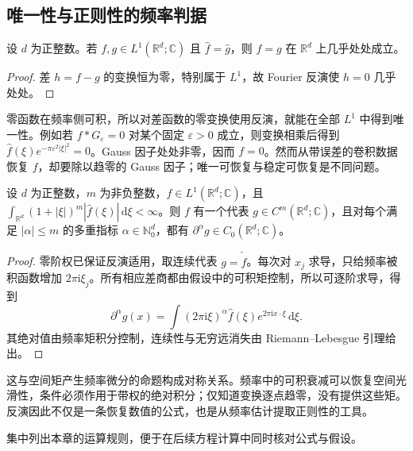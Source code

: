 \subsection{唯一性与正则性的频率判据}
\label{b2:subsec:030504}

\begin{corollary}[唯一性]\label{b2:cor:03-uniqueness}
设 \(d\) 为正整数。若 \(f,g\in L^1(\mathbb R^d;\mathbb C)\) 且 \(\widehat f=\widehat g\)，则 \(f=g\) 在 \(\mathbb R^d\) 上几乎处处成立。
\end{corollary}
\begin{proof}
差 \(h=f-g\) 的变换恒为零，特别属于 \(L^1\)，故 Fourier 反演使 \(h=0\) 几乎处处。
\end{proof}

零函数在频率侧可积，所以对差函数的零变换使用反演，就能在全部 \(L^1\) 中得到唯一性。例如若 \(f*G_\varepsilon=0\) 对某个固定 \(\varepsilon>0\) 成立，则变换相乘后得到 \(\widehat f(\xi)e^{-\pi\varepsilon^2|\xi|^2}=0\)。Gauss 因子处处非零，因而 \(f=0\)。然而从带误差的卷积数据恢复 \(f\)，却要除以趋零的 Gauss 因子；唯一可恢复与稳定可恢复是不同问题。



\begin{proposition}\label{b2:prop:03-inverse-regularity}
设 \(d\) 为正整数，\(m\) 为非负整数，\(f\in L^1(\mathbb R^d;\mathbb C)\)，且 \(\int_{\mathbb R^d}(1+|\xi|)^m|\widehat f(\xi)|\,\mathrm{d}\xi<\infty\)。则 \(f\) 有一个代表 \(g\in C^m(\mathbb R^d;\mathbb C)\)，且对每个满足 \(|\alpha|\leq m\) 的多重指标 \(\alpha\in\mathbb N_0^d\)，都有 \(\partial^\alpha g\in C_0(\mathbb R^d;\mathbb C)\)。
\end{proposition}
\begin{proof}
零阶权已保证反演适用，取连续代表 \(g=\check {\widehat f}\)。每次对 \(x_j\) 求导，只给频率被积函数增加 \(2\pi\mathrm{i}\xi_j\)。所有相应差商都由假设中的可积矩控制，所以可逐阶求导，得到
\[
 \partial^\alpha g(x)=\int(2\pi\mathrm{i}\xi)^\alpha\widehat f(\xi)e^{2\pi\mathrm{i}x\cdot\xi}\,\mathrm{d}\xi.
\]
其绝对值由频率矩积分控制，连续性与无穷远消失由 Riemann--Lebesgue 引理给出。
\end{proof}

这与空间矩产生频率微分的命题构成对称关系。频率中的可积衰减可以恢复空间光滑性，条件必须作用于带权的绝对积分；仅知道变换逐点趋零，没有提供这些矩。反演因此不仅是一条恢复数值的公式，也是从频率估计提取正则性的工具。


集中列出本章的运算规则，便于在后续方程计算中同时核对公式与假设。

